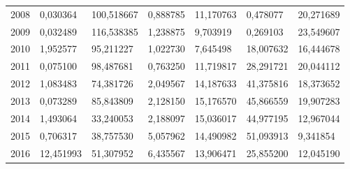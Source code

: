 \begin{table}
\begin{tabular}{p{1cm}p{2cm}p{2cm}p{2cm}p{2cm}p{2cm}p{2cm}}
 2008 &                 0,030364 &                                   100,518667 &   0,888785 &                        11,170763 &                                      0,478077 &                                   20,271689 \\
 2009 &                 0,032489 &                                   116,538385 &   1,238875 &                         9,703919 &                                      0,269103 &                                   23,549607 \\
 2010 &                 1,952577 &                                    95,211227 &   1,022730 &                         7,645498 &                                     18,007632 &                                   16,444678 \\
 2011 &                 0,075100 &                                    98,487681 &   0,763250 &                        11,719817 &                                     28,291721 &                                   20,044112 \\
 2012 &                 1,083483 &                                    74,381726 &   2,049567 &                        14,187633 &                                     41,375816 &                                   18,373652 \\
 2013 &                 0,073289 &                                    85,843809 &   2,128150 &                        15,176570 &                                     45,866559 &                                   19,907283 \\
 2014 &                 1,493064 &                                    33,240053 &   2,188097 &                        15,036017 &                                     44,977195 &                                   12,967044 \\
 2015 &                 0,706317 &                                    38,757530 &   5,057962 &                        14,490982 &                                     51,093913 &                                    9,341854 \\
 2016 &                12,451993 &                                    51,307952 &   6,435567 &                        13,906471 &                                     25,855200 &                                   12,045190 \\
\bottomrule
\end{tabular}
\end{table}
